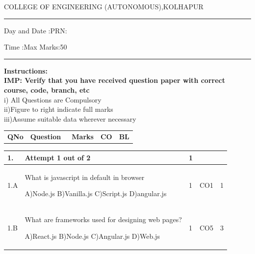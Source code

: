 \documentclass[12pt]{article}
\begin{document}
	\par
	COLLEGE OF ENGINEERING (AUTONOMOUS),KOLHAPUR
	\par\noindent\rule{\textwidth}{0.4pt}
	
	\par
	\par
	\par
	\begin{flushleft}
		Day and Date :{}\hspace{5.5cm}PRN:
	\end{flushleft}
	
	\begin{flushleft}
		Time :{}\hspace{7cm}Max Marks:{50}\\
	\end{flushleft}
	\noindent\rule{\textwidth}{0.1pt}
\begin{flushleft}
	{\bf Instructions:}\\
	{\hspace{0.5cm} \bf IMP: Verify that you have received question paper with correct course, code, branch, etc}\\
	\hspace{1cm}i) All Questions are Compulsory\\
	\hspace{1cm}ii)Figure to right indicate full marks\\
	\hspace{1cm}iii)Assume suitable data wherever necessary\\
\end{flushleft}

\begin{tabular}{L{1cm}C{9cm}C{2cm}C{2cm}C{1cm}}
	\bf{QNo} & 
	\bf{Question}\
	
	&
	\bf{Marks}&
	\bf{CO}&
	\bf{BL}
	
	
	
	
\end{tabular} 
	\begin{tabular}{|L{1cm}|L{9cm}|C{2cm}|C{2cm}|C{1cm}|}
		1. & Attempt 1 out of 2 & 1  & & \\ \hline
				1.A & What is javascript in default in browser \newline
					
		A)Node.js\newline
		B)Vanilla.js\newline
		C)Script.js\newline
		D)angular.js &
		1 &
		CO1&
		1 \\ \hline
		
				1.B & What are frameworks used for designing web pages? \newline
					
		A)React.js\newline
		B)Node.js\newline
		C)Angular.js\newline
		D)Web.js &
		1 &
		CO5&
		3 \\ \hline
		
		
	\end{tabular}
\end{document}
